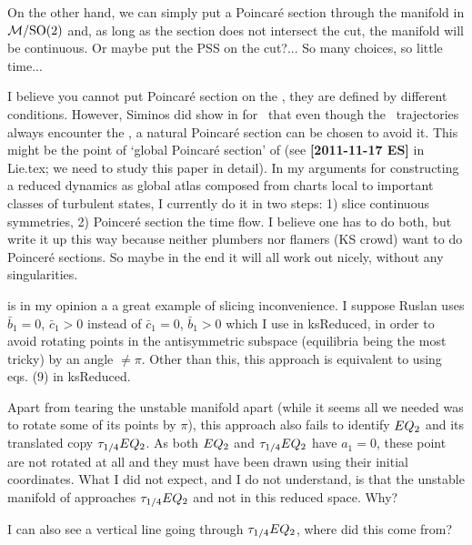 \begin{description}
    On the other hand, we can simply put a Poincar\'e section through the
    manifold in ${\cal M}/\textrm{SO}(2)$ and, as long as the section does not intersect
    the cut, the manifold will be continuous.  Or maybe put the PSS on
    the cut?...  So many choices, so little time...

\item[2011-11-19 Predrag] I believe you cannot put Poincar\'e section on
the \sset, they are defined by different conditions. However, Siminos did
show in  for \cLe\ that even though the \reducedsp\
trajectories always encounter the \sset, a natural Poincar\'e section can
be chosen to avoid it. This might be the point of `global Poincar\'{e}
section' of \refref{DuLoMe11} (see {\bf [2011-11-17 ES] } in Lie.tex; we
need to study this paper in detail). In my arguments\rf{ACHKW11} for
constructing a reduced dynamics as global atlas composed from charts
local to important classes of turbulent states, I currently do it in two
steps: 1) slice continuous symmetries, 2) Poincer\'e section the time
flow. I believe one has to do both, but write it up this way because
neither plumbers nor flamers (KS crowd) want to do Poincer\'e sections.
So maybe in the end it will all work out nicely, without any
singularities.

\item[2011-11-21 Evangelos]  is in my opinion a
a great example of slicing inconvenience. I suppose Ruslan uses
$\bar{b}_1 = 0$, $\bar{c}_1 > 0$ instead of $\bar{c}_1 = 0$, $\bar{b}_1 > 0$
which I use in ksReduced, in order to avoid rotating points in the antisymmetric
subspace (equilibria being the most tricky) by an angle $\neq \pi$.
Other than this, this approach is equivalent to using eqs. (9) in ksReduced.

Apart from tearing the unstable manifold apart (while it seems all we needed
was to rotate some of its points by $\pi$), this approach also fails to identify
$EQ_{2}$ and its translated copy $\tau_{1/4}EQ_{2}$. As both $EQ_{2}$ and
$\tau_{1/4}EQ_{2}$ have $a_1=0$, these point are not rotated at all and they must
have been drawn using their initial coordinates. What I did not expect,
and I do not understand, is that the unstable manifold of 
approaches $\tau_{1/4}EQ_{2}$ and not \EQV{2} in this reduced space. Why?

I can also see a vertical line going through $\tau_{1/4}EQ_{2}$, where did this
come from?



\end{description}
